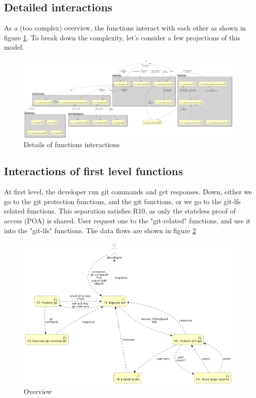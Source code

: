 \subsection{Detailed interactions}

As a (too complex) overview, the functions interact with each other as shown in figure \ref{fig:functions_detail}. To break down the complexity, let's consider a few projections of this model.

\begin{figure}[h]
    \centering
    \includegraphics[width=\textwidth]{iteration_00/diagrams/detailed_flow.png}
    \caption{Details of functions interactions}
    \label{fig:functions_detail}
\end{figure}

\subsection{Interactions of first level functions}

At first level, the developer run git commands and get responses. Down, either we go to the git protection functions, and the git functions, or we go to the git-lfs related functions. This separation satisfies R10, as only the stateless proof of access (POA) is shared. User request one to the "git-related" functions, and use it into the "git-lfs" functions. The data flows are shown in figure \ref{fig:functions_overview}

\begin{figure}[h]
    \centering
    \includegraphics[width=\textwidth]{iteration_00/diagrams/overwiew_flow.png}
    \caption{Overview}
    \label{fig:functions_overview}
\end{figure}

